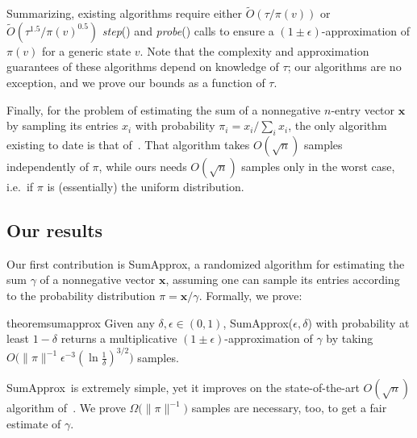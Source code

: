\documentclass[a4paper,11pt]{article}
\newcommand{\step}{\textit{step}}
\newcommand{\probe}{\textit{probe}}
\newcommand{\sumest}{SumApprox}
\begin{document}
Summarizing, existing algorithms require either $\tilde{O}(\tau / \pi(v))$ or $\tilde{O}(\tau^{1.5} / \pi(v)^{0.5})$ \step() and \probe() calls to ensure a $(1\pm\epsilon)$-approximation of $\pi(v)$ for a generic state $v$.
Note that the complexity and approximation guarantees of these algorithms depend on knowledge of $\tau$; our algorithms are no exception, and we prove our bounds as a function of $\tau$.

Finally, for the problem of estimating the sum of a nonnegative $n$-entry vector $\mathbf{x}$ by sampling its entries $x_i$ with probability $\pi_i = x_i / \sum_{i}x_i$, the only algorithm existing to date is that of~\cite{Motwani&2007}.
That algorithm takes $O(\sqrt{n})$ samples independently of $\pi$, while ours needs $O(\sqrt{n})$ samples only in the worst case, i.e.\ if $\pi$ is (essentially) the uniform distribution.

\subsection{Our results}
\label{sub:results}
Our first contribution is \sumest, a randomized algorithm for estimating the sum $\gamma$ of a nonnegative vector $\mathbf{x}$, assuming one can sample its entries according to the probability distribution $\pi = \mathbf{x} / \gamma$.
Formally, we prove:
\begin{restatable}{theorem}{sumapprox}
\label{thm:sumapprox}
Given any $\delta,\epsilon \in (0,1)$, \sumest($\epsilon,\delta$) with probability at least $1-\delta$ returns a multiplicative $(1\pm \epsilon)$-approximation of $\gamma$ by taking $O\big(\|\pi\|^{-1} \epsilon^{-3}(\ln{\frac{1}{\delta}})^{3/2}\big)$ samples.
\end{restatable}
\noindent \sumest\ is extremely simple, yet it improves on the state-of-the-art $O(\sqrt{n})$ algorithm of~\cite{Motwani&2007}.
We prove $\Omega\big(\|\pi\|^{-1}\big)$ samples are necessary, too, to get a fair estimate of $\gamma$.
\end{document}
